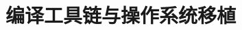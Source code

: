 \documentclass[../../main.tex]{subfiles}
\begin{document}
\chapter{编译工具链与操作系统移植}
\label{ch:05-toolchain-os}




\end{document}
